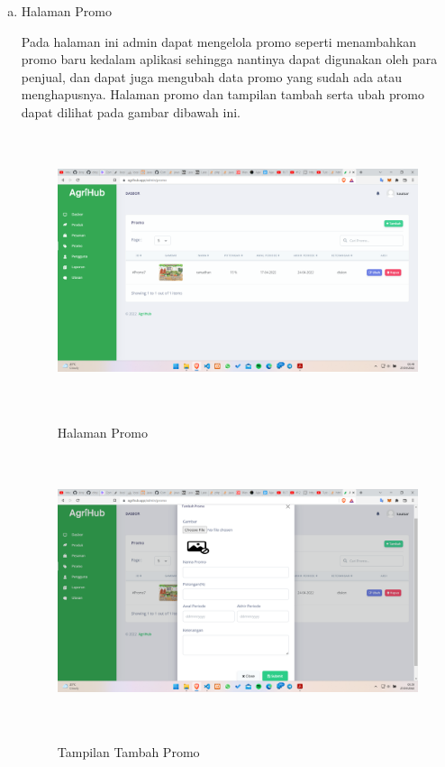 \begin{enumerate}
\begin{enumerate}[a.]
		\item Halaman Promo
		\par Pada halaman ini admin dapat mengelola promo seperti menambahkan promo baru kedalam aplikasi sehingga nantinya dapat digunakan oleh para penjual, dan dapat juga mengubah data promo yang sudah ada atau menghapusnya. Halaman promo dan tampilan tambah serta ubah promo dapat dilihat pada gambar dibawah ini.
		\begin{figure}[H]
			\centering
			{\includegraphics [width = 13.3cm, height= 8cm]{gambar/admin/promo}}
			\caption{Halaman Promo}
			\label{promo}
		\end{figure}
		\begin{figure}[H]
			\centering
			{\includegraphics [width = 13.3cm, height= 8cm]{gambar/admin/tambah_promo}}
			\caption{Tampilan Tambah Promo}
			\label{tambah_promo}
		\end{figure}
		\begin{figure}[H]
			\centering

\end{figure}
\end{enumerate}
\end{enumerate}

